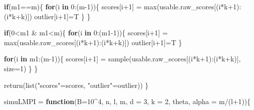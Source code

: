 \documentclass[
]{article}
\newenvironment{Shaded}{\begin{snugshade}}{\end{snugshade}}
\newcommand{\AttributeTok}[1]{\textcolor[rgb]{0.77,0.63,0.00}{#1}}
\newcommand{\ControlFlowTok}[1]{\textcolor[rgb]{0.13,0.29,0.53}{\textbf{#1}}}
\newcommand{\DecValTok}[1]{\textcolor[rgb]{0.00,0.00,0.81}{#1}}
\newcommand{\FunctionTok}[1]{\textcolor[rgb]{0.00,0.00,0.00}{#1}}
\newcommand{\NormalTok}[1]{#1}
\newcommand{\OtherTok}[1]{\textcolor[rgb]{0.56,0.35,0.01}{#1}}
\newcommand{\SpecialCharTok}[1]{\textcolor[rgb]{0.00,0.00,0.00}{#1}}
\newcommand{\StringTok}[1]{\textcolor[rgb]{0.31,0.60,0.02}{#1}}
\begin{document}
\begin{Shaded}
\begin{Highlighting}[]
  \ControlFlowTok{if}\NormalTok{(m1}\SpecialCharTok{==}\NormalTok{m)\{}
    \ControlFlowTok{for}\NormalTok{(i }\ControlFlowTok{in} \DecValTok{0}\SpecialCharTok{:}\NormalTok{(m}\DecValTok{{-}1}\NormalTok{))\{}
\NormalTok{      scores[i}\SpecialCharTok{+}\DecValTok{1}\NormalTok{] }\OtherTok{=} \FunctionTok{max}\NormalTok{(usable.raw\_scores[(i}\SpecialCharTok{*}\NormalTok{k}\SpecialCharTok{+}\DecValTok{1}\NormalTok{)}\SpecialCharTok{:}\NormalTok{(i}\SpecialCharTok{*}\NormalTok{k}\SpecialCharTok{+}\NormalTok{k)])}
\NormalTok{      outlier[i}\SpecialCharTok{+}\DecValTok{1}\NormalTok{]}\OtherTok{=}\NormalTok{T}
\NormalTok{    \}}
\NormalTok{  \}}
  
  \ControlFlowTok{if}\NormalTok{(}\DecValTok{0}\SpecialCharTok{\textless{}}\NormalTok{m1 }\SpecialCharTok{\&}\NormalTok{ m1}\SpecialCharTok{\textless{}}\NormalTok{m)\{}
    \ControlFlowTok{for}\NormalTok{(i }\ControlFlowTok{in} \DecValTok{0}\SpecialCharTok{:}\NormalTok{(m1}\DecValTok{{-}1}\NormalTok{))\{}
\NormalTok{      scores[i}\SpecialCharTok{+}\DecValTok{1}\NormalTok{] }\OtherTok{=} \FunctionTok{max}\NormalTok{(usable.raw\_scores[(i}\SpecialCharTok{*}\NormalTok{k}\SpecialCharTok{+}\DecValTok{1}\NormalTok{)}\SpecialCharTok{:}\NormalTok{(i}\SpecialCharTok{*}\NormalTok{k}\SpecialCharTok{+}\NormalTok{k)])}
\NormalTok{      outlier[i}\SpecialCharTok{+}\DecValTok{1}\NormalTok{]}\OtherTok{=}\NormalTok{T}
\NormalTok{    \}}
  
    \ControlFlowTok{for}\NormalTok{(i }\ControlFlowTok{in}\NormalTok{ m1}\SpecialCharTok{:}\NormalTok{(m}\DecValTok{{-}1}\NormalTok{))\{}
\NormalTok{      scores[i}\SpecialCharTok{+}\DecValTok{1}\NormalTok{] }\OtherTok{=} \FunctionTok{sample}\NormalTok{(usable.raw\_scores[(i}\SpecialCharTok{*}\NormalTok{k}\SpecialCharTok{+}\DecValTok{1}\NormalTok{)}\SpecialCharTok{:}\NormalTok{(i}\SpecialCharTok{*}\NormalTok{k}\SpecialCharTok{+}\NormalTok{k)], }\AttributeTok{size=}\DecValTok{1}\NormalTok{)}
\NormalTok{    \}}
\NormalTok{  \}}

  \FunctionTok{return}\NormalTok{(}\FunctionTok{list}\NormalTok{(}\StringTok{"scores"}\OtherTok{=}\NormalTok{scores, }\StringTok{"outlier"}\OtherTok{=}\NormalTok{outlier))}
\NormalTok{\}}






\NormalTok{simuLMPI }\OtherTok{=} \ControlFlowTok{function}\NormalTok{(}\AttributeTok{B=}\DecValTok{10}\SpecialCharTok{\^{}}\DecValTok{4}\NormalTok{, n, l, m, }\AttributeTok{d =} \DecValTok{3}\NormalTok{, }\AttributeTok{k =} \DecValTok{2}\NormalTok{, theta, }\AttributeTok{alpha =}\NormalTok{ m}\SpecialCharTok{/}\NormalTok{(l}\SpecialCharTok{+}\DecValTok{1}\NormalTok{))\{}


\end{Highlighting}
\end{Shaded}
\end{document}
